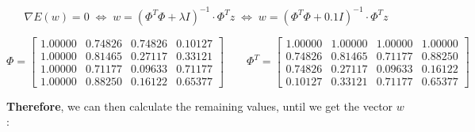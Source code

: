 \documentclass[12pt]{article}
\begin{document}
\begin{enumerate}[leftmargin=\labelsep]
\begin{enumerate}
                \vskip -0.2cm
                \begin{equation}\label{ex1a-ridge}
                  \nabla E(w) = 0 \;\Leftrightarrow\; w = \left(\Phi^T \Phi + \lambda I\right)^{-1} \cdot \Phi^T z
                  \;\Leftrightarrow\; w = \left(\Phi^T \Phi + 0.1 I\right)^{-1} \cdot \Phi^T z
                \end{equation}

                \vskip -0.2cm
                $$
                  \Phi = \begin{bmatrix}
                    1.00000 & 0.74826 & 0.74826 & 0.10127 \\
                    1.00000 & 0.81465 & 0.27117 & 0.33121 \\
                    1.00000 & 0.71177 & 0.09633 & 0.71177 \\
                    1.00000 & 0.88250 & 0.16122 & 0.65377
                  \end{bmatrix}
                  \quad
                  \quad
                  \Phi^T = \begin{bmatrix}
                    1.00000 & 1.00000 & 1.00000 & 1.00000 \\
                    0.74826 & 0.81465 & 0.71177 & 0.88250 \\
                    0.74826 & 0.27117 & 0.09633 & 0.16122 \\
                    0.10127 & 0.33121 & 0.71177 & 0.65377
                  \end{bmatrix}
                $$

                \textbf{Therefore}, we can then calculate the remaining values, until we get the vector $w$:


\end{enumerate}
\end{enumerate}
\end{document}
